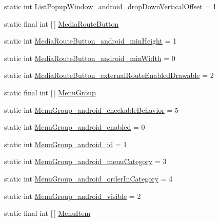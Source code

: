 \begin{DoxyCompactItemize}
static int \hyperlink{classandroid_1_1support_1_1v4_1_1R_1_1styleable_a54cc42e9f9c914a25d69d42af01dc638}{List\+Popup\+Window\+\_\+android\+\_\+drop\+Down\+Vertical\+Offset} = 1
\item 
static final int \mbox{[}$\,$\mbox{]} \hyperlink{classandroid_1_1support_1_1v4_1_1R_1_1styleable_ae8d0883da61f12dee4f79a15ab16cd9b}{Media\+Route\+Button}
\item 
static int \hyperlink{classandroid_1_1support_1_1v4_1_1R_1_1styleable_a91b1329e34bb685c52de237248568539}{Media\+Route\+Button\+\_\+android\+\_\+min\+Height} = 1
\item 
static int \hyperlink{classandroid_1_1support_1_1v4_1_1R_1_1styleable_ae31db3f058509971e536ad13a3e1790f}{Media\+Route\+Button\+\_\+android\+\_\+min\+Width} = 0
\item 
static int \hyperlink{classandroid_1_1support_1_1v4_1_1R_1_1styleable_ac728c56a3c75dec0ada942aaeb369128}{Media\+Route\+Button\+\_\+external\+Route\+Enabled\+Drawable} = 2
\item 
static final int \mbox{[}$\,$\mbox{]} \hyperlink{classandroid_1_1support_1_1v4_1_1R_1_1styleable_a83610c6b8679a40b3508815b6fd56980}{Menu\+Group}
\item 
static int \hyperlink{classandroid_1_1support_1_1v4_1_1R_1_1styleable_a3fb026c5081357018f4b79cc18961297}{Menu\+Group\+\_\+android\+\_\+checkable\+Behavior} = 5
\item 
static int \hyperlink{classandroid_1_1support_1_1v4_1_1R_1_1styleable_a0ef41259de1dde6c511a4b586a9a393d}{Menu\+Group\+\_\+android\+\_\+enabled} = 0
\item 
static int \hyperlink{classandroid_1_1support_1_1v4_1_1R_1_1styleable_a4991b9572aa5383361a4a0898b840fb6}{Menu\+Group\+\_\+android\+\_\+id} = 1
\item 
static int \hyperlink{classandroid_1_1support_1_1v4_1_1R_1_1styleable_a1c7a436a1a116da0d50730f4f6d23476}{Menu\+Group\+\_\+android\+\_\+menu\+Category} = 3
\item 
static int \hyperlink{classandroid_1_1support_1_1v4_1_1R_1_1styleable_a63ffd78acd037e7733c69b1130737dff}{Menu\+Group\+\_\+android\+\_\+order\+In\+Category} = 4
\item 
static int \hyperlink{classandroid_1_1support_1_1v4_1_1R_1_1styleable_ac3db0cd59a9a1fe7f84c406651350dbe}{Menu\+Group\+\_\+android\+\_\+visible} = 2
\item 
static final int \mbox{[}$\,$\mbox{]} \hyperlink{classandroid_1_1support_1_1v4_1_1R_1_1styleable_a4234e016636b99c0c3d9cfc512903697}{Menu\+Item}
\item 

\end{DoxyCompactItemize}
